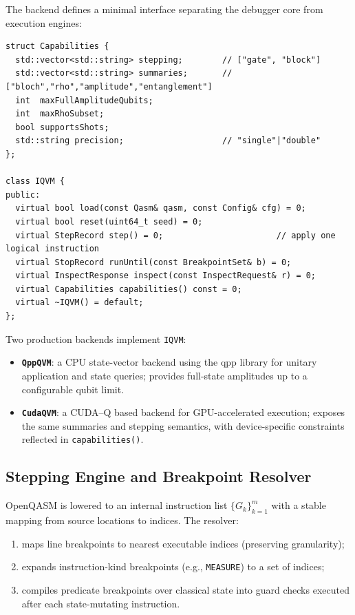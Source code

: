 \documentclass[12pt]{article}
\begin{document}
\begin{itemize}
The backend defines a minimal interface separating the debugger core from execution engines:

\begin{lstlisting}[basicstyle=\ttfamily\small]
struct Capabilities {
  std::vector<std::string> stepping;        // ["gate", "block"]
  std::vector<std::string> summaries;       // ["bloch","rho","amplitude","entanglement"]
  int  maxFullAmplitudeQubits;
  int  maxRhoSubset;
  bool supportsShots;
  std::string precision;                    // "single"|"double"
};

class IQVM {
public:
  virtual bool load(const Qasm& qasm, const Config& cfg) = 0;
  virtual bool reset(uint64_t seed) = 0;
  virtual StepRecord step() = 0;                       // apply one logical instruction
  virtual StopRecord runUntil(const BreakpointSet& b) = 0;
  virtual InspectResponse inspect(const InspectRequest& r) = 0;
  virtual Capabilities capabilities() const = 0;
  virtual ~IQVM() = default;
};
\end{lstlisting}

Two production backends implement \texttt{IQVM}:

\begin{itemize}
  \item \textbf{\texttt{QppQVM}}: a CPU state-vector backend using the qpp library for unitary application and state queries; provides full-state amplitudes up to a configurable qubit limit.
  \item \textbf{\texttt{CudaQVM}}: a CUDA--Q based backend for GPU-accelerated execution; exposes the same summaries and stepping semantics, with device-specific constraints reflected in \texttt{capabilities()}.
\end{itemize}

\subsection{Stepping Engine and Breakpoint Resolver}

OpenQASM is lowered to an internal instruction list \(\{G_k\}_{k=1}^m\) with a stable mapping from source locations to indices. The resolver:

\begin{enumerate}
  \item maps line breakpoints to nearest executable indices (preserving granularity);
  \item expands instruction-kind breakpoints (e.g., \texttt{MEASURE}) to a set of indices;
  \item compiles predicate breakpoints over classical state into guard checks executed after each state-mutating instruction.
\end{enumerate}


\end{itemize}
\end{document}
